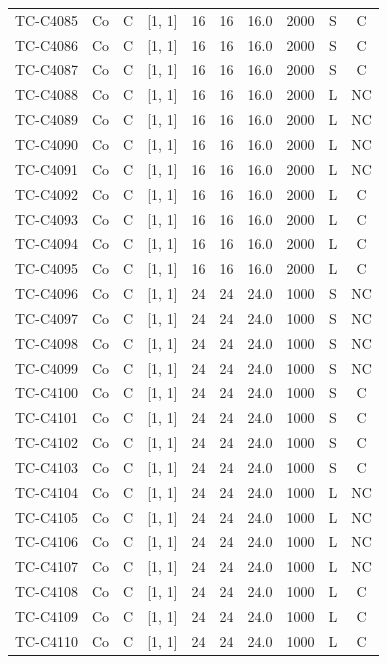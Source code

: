 \begin{longtable}{lccccccccc}
TC-C4085 & Co & C & [1, 1] & 16 & 16 & 16.0 & 2000 & S & C \\
TC-C4086 & Co & C & [1, 1] & 16 & 16 & 16.0 & 2000 & S & C \\
TC-C4087 & Co & C & [1, 1] & 16 & 16 & 16.0 & 2000 & S & C \\
TC-C4088 & Co & C & [1, 1] & 16 & 16 & 16.0 & 2000 & L & NC \\
TC-C4089 & Co & C & [1, 1] & 16 & 16 & 16.0 & 2000 & L & NC \\
TC-C4090 & Co & C & [1, 1] & 16 & 16 & 16.0 & 2000 & L & NC \\
TC-C4091 & Co & C & [1, 1] & 16 & 16 & 16.0 & 2000 & L & NC \\
TC-C4092 & Co & C & [1, 1] & 16 & 16 & 16.0 & 2000 & L & C \\
TC-C4093 & Co & C & [1, 1] & 16 & 16 & 16.0 & 2000 & L & C \\
TC-C4094 & Co & C & [1, 1] & 16 & 16 & 16.0 & 2000 & L & C \\
TC-C4095 & Co & C & [1, 1] & 16 & 16 & 16.0 & 2000 & L & C \\
TC-C4096 & Co & C & [1, 1] & 24 & 24 & 24.0 & 1000 & S & NC \\
TC-C4097 & Co & C & [1, 1] & 24 & 24 & 24.0 & 1000 & S & NC \\
TC-C4098 & Co & C & [1, 1] & 24 & 24 & 24.0 & 1000 & S & NC \\
TC-C4099 & Co & C & [1, 1] & 24 & 24 & 24.0 & 1000 & S & NC \\
TC-C4100 & Co & C & [1, 1] & 24 & 24 & 24.0 & 1000 & S & C \\
TC-C4101 & Co & C & [1, 1] & 24 & 24 & 24.0 & 1000 & S & C \\
TC-C4102 & Co & C & [1, 1] & 24 & 24 & 24.0 & 1000 & S & C \\
TC-C4103 & Co & C & [1, 1] & 24 & 24 & 24.0 & 1000 & S & C \\
TC-C4104 & Co & C & [1, 1] & 24 & 24 & 24.0 & 1000 & L & NC \\
TC-C4105 & Co & C & [1, 1] & 24 & 24 & 24.0 & 1000 & L & NC \\
TC-C4106 & Co & C & [1, 1] & 24 & 24 & 24.0 & 1000 & L & NC \\
TC-C4107 & Co & C & [1, 1] & 24 & 24 & 24.0 & 1000 & L & NC \\
TC-C4108 & Co & C & [1, 1] & 24 & 24 & 24.0 & 1000 & L & C \\
TC-C4109 & Co & C & [1, 1] & 24 & 24 & 24.0 & 1000 & L & C \\
TC-C4110 & Co & C & [1, 1] & 24 & 24 & 24.0 & 1000 & L & C \\

\end{longtable}
